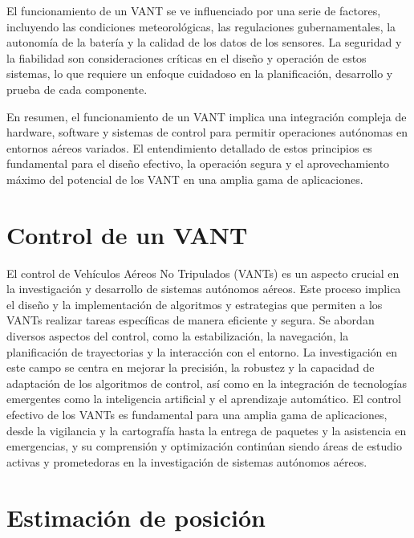 El funcionamiento de un VANT se ve influenciado por una serie de factores, incluyendo las condiciones meteorológicas, las regulaciones gubernamentales, la autonomía de la batería y la calidad de los datos de los sensores. La seguridad y la fiabilidad son consideraciones críticas en el diseño y operación de estos sistemas, lo que requiere un enfoque cuidadoso en la planificación, desarrollo y prueba de cada componente.

En resumen, el funcionamiento de un VANT implica una integración compleja de hardware, software y sistemas de control para permitir operaciones autónomas en entornos aéreos variados. El entendimiento detallado de estos principios es fundamental para el diseño efectivo, la operación segura y el aprovechamiento máximo del potencial de los VANT en una amplia gama de aplicaciones.

\section{Control de un VANT}

El control de Vehículos Aéreos No Tripulados (VANTs) es un aspecto crucial en la investigación y desarrollo de sistemas autónomos aéreos. Este proceso implica el diseño y la implementación de algoritmos y estrategias que permiten a los VANTs realizar tareas específicas de manera eficiente y segura. Se abordan diversos aspectos del control, como la estabilización, la navegación, la planificación de trayectorias y la interacción con el entorno. La investigación en este campo se centra en mejorar la precisión, la robustez y la capacidad de adaptación de los algoritmos de control, así como en la integración de tecnologías emergentes como la inteligencia artificial y el aprendizaje automático. El control efectivo de los VANTs es fundamental para una amplia gama de aplicaciones, desde la vigilancia y la cartografía hasta la entrega de paquetes y la asistencia en emergencias, y su comprensión y optimización continúan siendo áreas de estudio activas y prometedoras en la investigación de sistemas autónomos aéreos.

\section{Estimación de posición}

